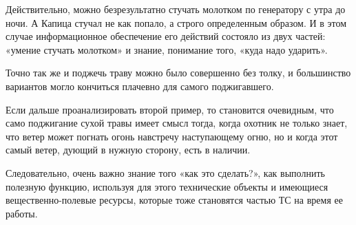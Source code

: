 \documentclass[11pt,a4paper]{article}
\begin{document}
Действительно, можно безрезультатно стучать молотком по генератору с утра до
ночи. А Капица стучал не как попало, а строго определенным образом. И в этом
случае информационное обеспечение его действий состояло из двух частей:
«умение стучать молотком» и знание, понимание того, «куда надо ударить».

Точно так же и поджечь траву можно было совершенно без толку, и большинство
вариантов могло кончиться плачевно для самого поджигавшего.

Если дальше проанализировать второй пример, то становится очевидным, что само
поджигание сухой травы имеет смысл тогда, когда охотник не только знает, что
ветер может погнать огонь навстречу наступающему огню, но и когда этот самый
ветер, дующий в нужную сторону, есть в наличии.

Следовательно, очень важно знание того «как это сделать?», как выполнить
полезную функцию, используя для этого технические объекты и имеющиеся
вещественно-полевые ресурсы, которые тоже становятся частью ТС на время ее
работы.
\end{document}
